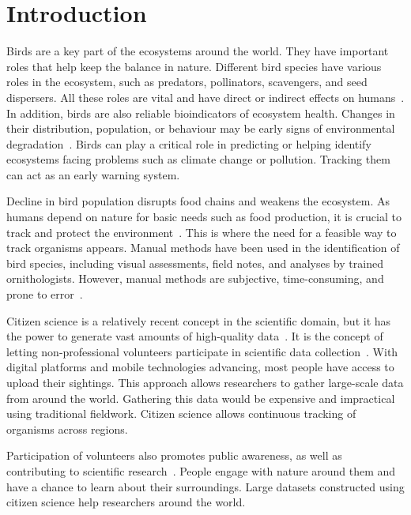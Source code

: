 \section{Introduction}

Birds are a key part of the ecosystems around the world. They have important roles
that help keep the balance in nature. Different bird species have various roles in the
ecosystem, such as predators, pollinators, scavengers, and seed dispersers. All these roles
are vital and have direct or indirect effects on humans~\cite{mariyappan2023ecological}.
In addition, birds are also reliable bioindicators of ecosystem health. Changes in their
distribution, population, or behaviour may be early signs of environmental
degradation~\cite{anderle2024efficiency}. Birds can play a critical role in predicting or
helping identify ecosystems facing problems such as climate change or pollution. Tracking
them can act as an early warning system.

Decline in bird population disrupts food chains and weakens the ecosystem. As humans
depend on nature for basic needs such as food production, it is crucial to track and protect
the environment~\cite{ellissoto2025biologging}. This is where the need for a feasible way
to track organisms appears. Manual methods have been used in the identification of bird
species, including visual assessments, field notes, and analyses by trained ornithologists.
However, manual methods are subjective, time-consuming, and prone to
error~\cite{kambali2024automated}.

Citizen science is a relatively recent concept in the scientific domain, but it has the
power to generate vast amounts of high-quality data~\cite{baker2021verification}. It is
the concept of letting non-professional volunteers participate in scientific data
collection~\cite{fraisl2022citizen, encarnacao2021citizen}. With digital platforms and
mobile technologies advancing, most people have access to upload their sightings. This
approach allows researchers to gather large-scale data from around the world. Gathering
this data would be expensive and impractical using traditional fieldwork. Citizen science
allows continuous tracking of organisms across regions.

Participation of volunteers also promotes public awareness, as well as contributing to
scientific research~\cite{bonney2015citizen}. People engage with nature around them and
have a chance to learn about their surroundings. Large datasets constructed using citizen
science help researchers around the world.


